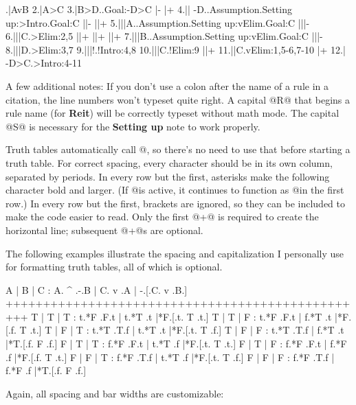 \nobreak
\endquantifiers
{}.|AvB
 2.|A>C
 3.|B>D..Goal:-D>C
   |-
   |+
 4.|| -D..Assumption.Setting up:>Intro.Goal:C
   ||-
   ||+
 5.|||A..Assumption.Setting up:vElim.Goal:C
   |||-
 6.|||C.>Elim:2,5
   ||+
   ||+
   ||+
 7.|||B..Assumption.Setting up:vElim.Goal:C
   |||-
 8.|||D.>Elim:3,7
 9.|||!.!Intro:4,8
10.|||C.!Elim:9
   ||+
11.||C.vElim:1,5-6,7-10
   |+
12.| -D>C.>Intro:4-11
\endfitchproof
\quantifiers

\noindent A few additional notes:
\unorderedlist
\li If you don't use a colon after the name of a rule in a citation, the line numbers won't typeset quite right. 
\li A capital @R@ that begins a rule name (for {\bf Reit}) will be correctly typeset without math mode.
\li The capital @S@ is necessary for the {\bf Setting up} note to work properly.
\endunorderedlist


\pagebreak



\unorderedlist
\li Truth tables automatically call @\endquantifiers@, so there's no need to use that before starting a truth table.
\li For correct spacing, every character should be in its own column, separated by periods.
\li In every row but the first, asterisks make the following character bold and larger. (If @\makeasteriskbig@ is active, it continues to function as @\big@ in the first row.)
\li In every row but the first, brackets are ignored, so they can be included to make the code easier to read.
\li Only the first @+@ is required to create the horizontal line; subsequent @+@s are optional.
\endunorderedlist

The following examples illustrate the spacing and capitalization I personally use for formatting truth tables, all of which is optional.

\truthtable
 A | B | C : A. ^ .-.B | C. v .A | -.[.C. v .B.]
+++++++++++++++++++++++++++++++++++++++++++++++++
 T | T | T : t.*F .F.t | t.*T .t |*F.[.t. T .t.]
 T | T | F : t.*F .F.t | f.*T .t |*F.[.f. T .t.]
 T | F | T : t.*T .T.f | t.*T .t |*F.[.t. T .f.]
 T | F | F : t.*T .T.f | f.*T .t |*T.[.f. F .f.]
 F | T | T : f.*F .F.t | t.*T .f |*F.[.t. T .t.]
 F | T | F : f.*F .F.t | f.*F .f |*F.[.f. T .t.]
 F | F | T : f.*F .T.f | t.*T .f |*F.[.t. T .f.]
 F | F | F : f.*F .T.f | f.*F .f |*T.[.f. F .f.]
\endtruthtable

\noindent Again, all spacing and bar widths are customizable:

\truthtablerowheight=12.5pt \truthtablerowdepth=4.5pt%
\truthtablefirstrowdepthadjust=2pt%
\truthtablelinethickness=1.6pt%
\truthtableinteritemspace=6pt%

